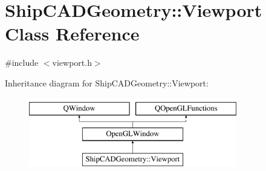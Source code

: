 \hypertarget{classShipCADGeometry_1_1Viewport}{\section{Ship\-C\-A\-D\-Geometry\-:\-:Viewport Class Reference}
\label{classShipCADGeometry_1_1Viewport}
}


{\ttfamily \#include $<$viewport.\-h$>$}

Inheritance diagram for Ship\-C\-A\-D\-Geometry\-:\-:Viewport\-:\begin{figure}[H]
\begin{center}
\leavevmode
\includegraphics[height=3.000000cm]{classShipCADGeometry_1_1Viewport}
\end{center}
\end{figure}
